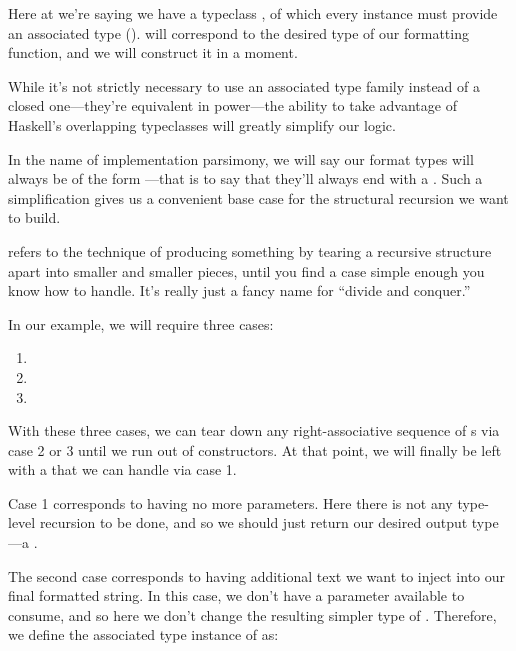 \documentclass[book.tex]{subfiles}
\begin{document}

Here at  we're saying we have a typeclass , of which
every instance must provide an associated type  ().
 will correspond to the desired type of our formatting function,
and we will construct it in a moment.

While it's not strictly necessary to use an associated type family instead of a
closed one---they're equivalent in power---the ability to take advantage of
Haskell's overlapping typeclasses will greatly simplify our logic.

In the name of implementation parsimony, we will say our format types will
always be of the form ---that is to say that they'll
always end with a . Such a simplification gives us a convenient
base case for the structural recursion we want to build.

 refers to the technique of
producing something by tearing a recursive structure apart into smaller and
smaller pieces, until you find a case simple enough you know how to handle. It's
really just a fancy name for ``divide and conquer.''

In our  example, we will require three cases:

\begin{enumerate}
  \item{}
  \item{}
  \item{}
\end{enumerate}

With these three cases, we can tear down any right-associative sequence of
\ty{(:<<)}s via case 2 or 3 until we run out of \ty{(:<<)} constructors. At that
point, we will finally be left with a  that we can handle via case
1.

Case 1 corresponds to having no more parameters. Here there is not any
type-level recursion to be done, and so we should just return our desired
output type---a .


The second case corresponds to having additional text we want to inject into our
final formatted string. In this case, we don't have a parameter available to
consume, and so here we don't change the resulting simpler type of .
Therefore, we define the associated type instance of  as:
\end{document}
